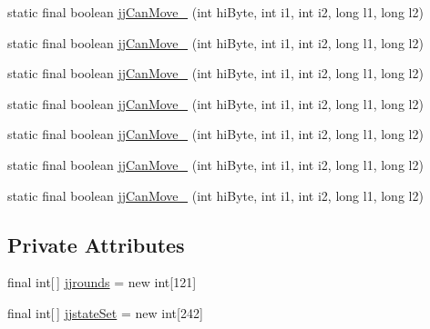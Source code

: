 \begin{DoxyCompactItemize}
static final boolean \hyperlink{classuk_1_1ac_1_1manchester_1_1cs_1_1owlapi_1_1dlsyntax_1_1parser_1_1_d_l_syntax_parser_token_manager_a02ac253be1cd0b39ef1771c7b3fb585d}{jj\-Can\-Move\-\_} (int hi\-Byte, int i1, int i2, long l1, long l2)
\item 
static final boolean \hyperlink{classuk_1_1ac_1_1manchester_1_1cs_1_1owlapi_1_1dlsyntax_1_1parser_1_1_d_l_syntax_parser_token_manager_ab913bfa0ebd518a74236d08f1f779bb1}{jj\-Can\-Move\-\_} (int hi\-Byte, int i1, int i2, long l1, long l2)
\item 
static final boolean \hyperlink{classuk_1_1ac_1_1manchester_1_1cs_1_1owlapi_1_1dlsyntax_1_1parser_1_1_d_l_syntax_parser_token_manager_ae96f742c3fa056452a7bf8e16785dd9e}{jj\-Can\-Move\-\_} (int hi\-Byte, int i1, int i2, long l1, long l2)
\item 
static final boolean \hyperlink{classuk_1_1ac_1_1manchester_1_1cs_1_1owlapi_1_1dlsyntax_1_1parser_1_1_d_l_syntax_parser_token_manager_ac8058cfc466645229a04470cb3b12ac7}{jj\-Can\-Move\-\_} (int hi\-Byte, int i1, int i2, long l1, long l2)
\item 
static final boolean \hyperlink{classuk_1_1ac_1_1manchester_1_1cs_1_1owlapi_1_1dlsyntax_1_1parser_1_1_d_l_syntax_parser_token_manager_a4525b0b3a36e53531bee40d3bbd0ab32}{jj\-Can\-Move\-\_} (int hi\-Byte, int i1, int i2, long l1, long l2)
\item 
static final boolean \hyperlink{classuk_1_1ac_1_1manchester_1_1cs_1_1owlapi_1_1dlsyntax_1_1parser_1_1_d_l_syntax_parser_token_manager_a347ecefcec5192c7cb1645a1a79652a5}{jj\-Can\-Move\-\_} (int hi\-Byte, int i1, int i2, long l1, long l2)
\item 
static final boolean \hyperlink{classuk_1_1ac_1_1manchester_1_1cs_1_1owlapi_1_1dlsyntax_1_1parser_1_1_d_l_syntax_parser_token_manager_a71a11e002c45444dc18d101ec03d043c}{jj\-Can\-Move\-\_} (int hi\-Byte, int i1, int i2, long l1, long l2)
\end{DoxyCompactItemize}
\subsection*{Private Attributes}
\begin{DoxyCompactItemize}
\item 
final int\mbox{[}$\,$\mbox{]} \hyperlink{classuk_1_1ac_1_1manchester_1_1cs_1_1owlapi_1_1dlsyntax_1_1parser_1_1_d_l_syntax_parser_token_manager_a4ae817a7be31d1ef9c5e13f64fd5a901}{jjrounds} = new int\mbox{[}121\mbox{]}
\item 
final int\mbox{[}$\,$\mbox{]} \hyperlink{classuk_1_1ac_1_1manchester_1_1cs_1_1owlapi_1_1dlsyntax_1_1parser_1_1_d_l_syntax_parser_token_manager_a13f083c5161355cfa352e795d7421f13}{jjstate\-Set} = new int\mbox{[}242\mbox{]}
\end{DoxyCompactItemize}


